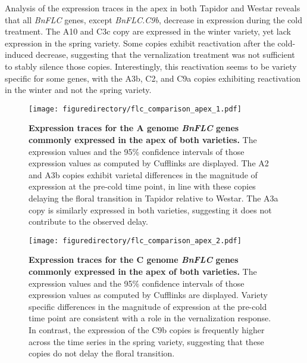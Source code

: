 \documentclass[12pt,]{book}
\begin{document}
Analysis of the expression traces in the apex in both Tapidor and Westar
reveals that all \emph{BnFLC} genes, except \emph{BnFLC.C9b}, decrease
in expression during the cold treatment. The A10 and C3c copy are
expressed in the winter variety, yet lack expression in the spring
variety. Some copies exhibit reactivation after the cold-induced
decrease, suggesting that the vernalization treatment was not sufficient
to stably silence those copies. Interestingly, this reactivation seems
to be variety specific for some genes, with the A3b, C2, and C9a copies
exhibiting reactivation in the winter and not the spring variety.

\begin{figure}[htbp]
\centering
\texttt{[image: figuredirectory/flc\_comparison\_apex\_1.pdf]}
\caption{\textbf{Expression traces for the A genome \emph{BnFLC} genes
commonly expressed in the apex of both varieties.} The expression values
and the 95\% confidence intervals of those expression values as computed
by Cufflinks are displayed. The A2 and A3b copies exhibit varietal
differences in the magnitude of expression at the pre-cold time point,
in line with these copies delaying the floral transition in Tapidor
relative to Westar. The A3a copy is similarly expressed in both
varieties, suggesting it does not contribute to the observed
delay.}\label{figure:3xx:flcapexagenome}
\end{figure}

\begin{figure}[htbp]
\centering
\texttt{[image: figuredirectory/flc\_comparison\_apex\_2.pdf]}
\caption{\textbf{Expression traces for the C genome \emph{BnFLC} genes
commonly expressed in the apex of both varieties.} The expression values
and the 95\% confidence intervals of those expression values as computed
by Cufflinks are displayed. Variety specific differences in the
magnitude of expression at the pre-cold time point are consistent with a
role in the vernalization response. In contrast, the expression of the
C9b copies is frequently higher across the time series in the spring
variety, suggesting that these copies do not delay the floral
transition.}\label{figure:3xx:flcapexcgenome}
\end{figure}
\end{document}
